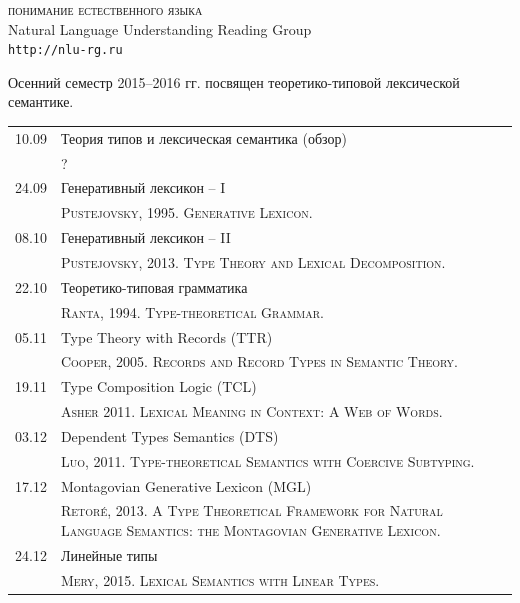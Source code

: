 \documentclass[12pt]{article}
\begin{document}

\parindent 0mm


\begin{center}
{\rm \Huge \textsc{понимание естественного языка}}\\
\bigskip
{\rm \Large Natural Language Understanding Reading Group}\\
\bigskip
{\rm \Large \texttt{http://nlu-rg.ru}}
\end{center}

\bigskip
\medskip

\begin{spacing}{1.2}
\hfill
\parbox{0.986\textwidth}{
Осенний семестр 2015--2016 гг. посвящен теоретико-типовой лексической семантике.
}
\end{spacing}

\medskip

\begin{table}[h!]
\begin{tabularx}{\textwidth}{cX}
10.09 & Теория типов и лексическая семантика (обзор) \bigstrut[t] \\
      & {\scriptsize \textsc{?}}  \bigstrut[b] \\
24.09 & Генеративный лексикон -- I \bigstrut[t] \\
      & {\scriptsize \textsc{Pustejovsky, 1995. Generative Lexicon.}} \bigstrut[b] \\
08.10 & Генеративный лексикон -- II \bigstrut[t] \\
      & {\scriptsize \textsc{Pustejovsky, 2013. Type Theory and Lexical Decomposition.}} \bigstrut[b] \\
22.10 & Теоретико-типовая грамматика \bigstrut[t] \\
      & {\scriptsize \textsc{Ranta, 1994. Type-theoretical Grammar.}}     \bigstrut[b] \\
05.11 & Type Theory with Records (TTR) \bigstrut[t] \\
      & {\scriptsize \textsc{Cooper, 2005. Records and Record Types in Semantic Theory.}} \bigstrut[b] \\
19.11 & Type Composition Logic (TCL)  \bigstrut[t] \\
      & {\scriptsize \textsc{Asher 2011. Lexical Meaning in Context: A Web of Words.}} \bigstrut[b] \\
03.12 & Dependent Types Semantics (DTS)  \bigstrut[t] \\
      & {\scriptsize \textsc{Luo, 2011. Type-theoretical Semantics with Coercive Subtyping.}} \bigstrut[b] \\
17.12 & Montagovian Generative Lexicon (MGL) \bigstrut[t] \\ 
      & {\scriptsize \textsc{Retor\'{e}, 2013. A Type Theoretical Framework for Natural Language Semantics: the Montagovian Generative Lexicon.}} \bigstrut[b] \\ 
24.12 & Линейные типы \bigstrut[t] \\
      & {\scriptsize \textsc{Mery, 2015. Lexical Semantics with Linear Types.}} \bigstrut[b] \\      
\end{tabularx}
\end{table}
\end{document}
